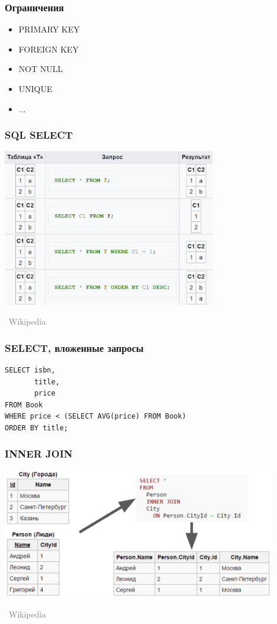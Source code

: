\documentclass[xetex,mathserif,serif]{beamer}
\newcommand{\attribution}[1] {
\vspace{-5mm}\begin{flushright}\begin{scriptsize}\textcolor{gray}{\textcopyright\, #1}\end{scriptsize}\end{flushright}
}
\begin{document}
	\begin{frame}
		\frametitle{Ограничения}
		\begin{itemize}
			\item PRIMARY KEY
			\item FOREIGN KEY
			\item NOT NULL
			\item UNIQUE
			\item ...
		\end{itemize}
	\end{frame}

	\begin{frame}
		\frametitle{SQL SELECT}
		\begin{center}
			\includegraphics[width=0.7\textwidth]{select.png}
			\attribution{Wikipedia}
		\end{center}
	\end{frame}

	\begin{frame}[fragile]
		\frametitle{SELECT, вложенные запросы}
		\begin{verbatim}
SELECT isbn,
       title,
       price
FROM Book
WHERE price < (SELECT AVG(price) FROM Book)
ORDER BY title;
		\end{verbatim}
	\end{frame}

	\begin{frame}
		\frametitle{INNER JOIN}
		\begin{center}
			\includegraphics[width=0.9\textwidth]{innerJoin.png}
			\attribution{Wikipedia}
		\end{center}
	\end{frame}
\end{document}
